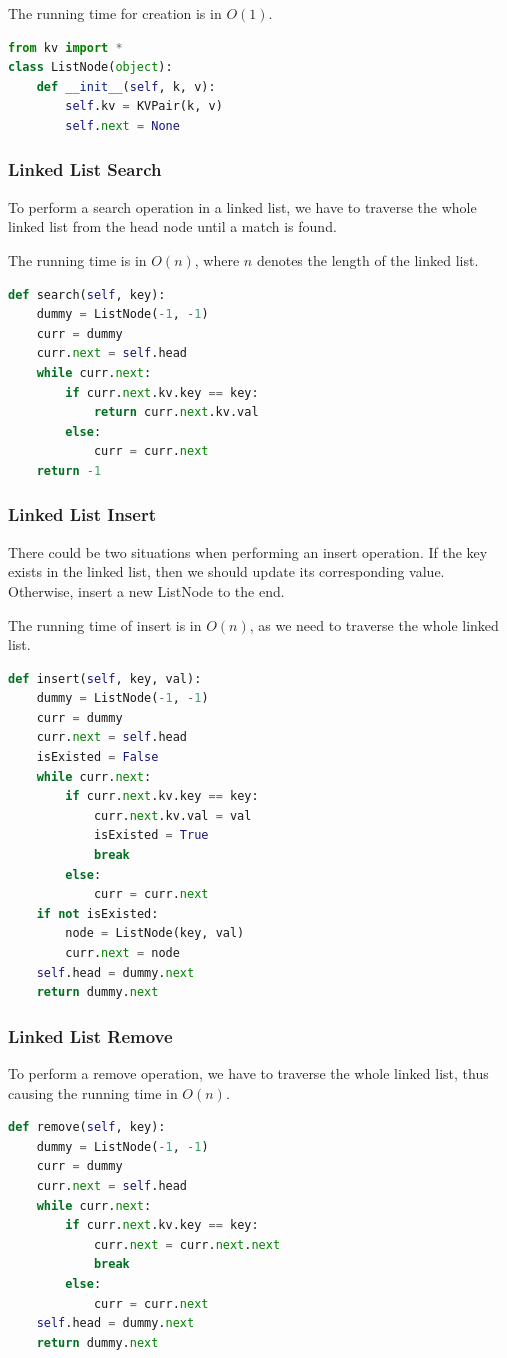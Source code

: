 \documentclass{article}
\begin{document}
\begin{spacing}{1.2}
The running time for creation is in $O(1)$. 
\begin{lstlisting}[language=Python]
from kv import *
class ListNode(object):
    def __init__(self, k, v):
        self.kv = KVPair(k, v)
        self.next = None
\end{lstlisting}

\subsubsection{Linked List Search}
To perform a search operation in a linked list, we have to traverse the whole linked list from the head node until a match is found.

The running time is in $O(n)$, where $n$ denotes the length of the linked list.
\begin{lstlisting}[language=Python]
def search(self, key):
    dummy = ListNode(-1, -1)
    curr = dummy
    curr.next = self.head
    while curr.next:
        if curr.next.kv.key == key:
            return curr.next.kv.val
        else:
            curr = curr.next
    return -1
\end{lstlisting}

\subsubsection{Linked List Insert}
There could be two situations when performing  an insert operation. If the key exists in the linked list, then we should update its corresponding value. Otherwise, insert a new ListNode to the end.

The running time of insert is in $O(n)$, as we need to traverse the whole linked list.
\begin{lstlisting}[language=Python]
def insert(self, key, val):
    dummy = ListNode(-1, -1)
    curr = dummy
    curr.next = self.head
    isExisted = False
    while curr.next:
        if curr.next.kv.key == key:
            curr.next.kv.val = val
            isExisted = True
            break
        else:
            curr = curr.next
    if not isExisted:
        node = ListNode(key, val)
        curr.next = node
    self.head = dummy.next
    return dummy.next
\end{lstlisting}

\subsubsection{Linked List Remove}
To perform a remove operation, we have to traverse the whole linked list, thus causing the running time in $O(n)$.
\begin{lstlisting}[language=Python]
def remove(self, key):
    dummy = ListNode(-1, -1)
    curr = dummy
    curr.next = self.head
    while curr.next:
        if curr.next.kv.key == key:
            curr.next = curr.next.next
            break
        else:
            curr = curr.next
    self.head = dummy.next
    return dummy.next
\end{lstlisting}


\end{spacing}
\end{document}
